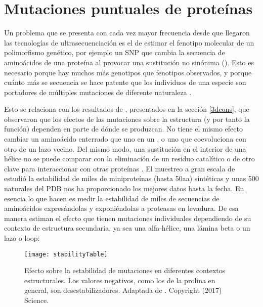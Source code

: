 

\section{Mutaciones puntuales de prote\'{i}nas} \label{pointmut}

Un problema que se presenta con cada vez mayor frecuencia desde que llegaron las tecnolog\'{i}as de 
ultrasecuenciaci\'{o}n es el de estimar el fenotipo molecular de un polimorfismo gen\'{e}tico, 
por ejemplo un SNP que cambia la secuencia de amino\'{a}cidos de una prote\'{i}na al provocar 
una sustituci\'{o}n no sin\'{o}nima (). 
Esto es necesario porque hay muchos m\'{a}s genotipos que fenotipos observados, y porque cu\'{a}nto m\'{a}s se secuencia se hace
patente que los individuos de una especie son portadores de m\'{u}ltiples mutaciones de diferente naturaleza
\citep{Peterson2013}.

Esto se relaciona con los resultados de \citet{Chothia1986}, presentados en la secci\'{o}n \ref{3dcons}, que 
observaron que los efectos de las mutaciones sobre la estructura (y por tanto la funci\'{o}n) dependen en
parte de d\'{o}nde se produzcan. No tiene el mismo efecto cambiar un amino\'{a}cido enterrado que uno en un
, o uno que coevoluciona con otro de un lazo vecino. Del mismo modo, una sustituci\'{o}n en el interior
de una h\'{e}lice no se puede comparar con la eliminaci\'{o}n de un residuo catal\'{i}tico \citep{Berrondo2011}
o de otro clave para interaccionar con otras prote\'{i}nas \citep{deJuan2013}. 
El muestreo a gran escala de \citet{Rocklin2017} estudi\'{o} la estabilidad de miles de miniprote\'{i}nas (hasta 50aa) sint\'{e}ticas 
y unas 500 naturales del PDB nos ha proporcionado los mejores datos hasta la fecha. En esencia lo que hacen es medir la estabilidad 
de miles de secuencias de amino\'{a}cidos expres\'{a}ndolas y exponi\'{e}ndolas a proteasas en levadura.
De esa manera estiman el efecto que tienen mutaciones individuales dependiendo de su contexto de estructura secundaria, 
ya sea una alfa-h\'{e}lice, una l\'{a}mina beta o un lazo o loop:

\begin{figure}
\begin{center} 
\texttt{[image: stabilityTable]}
\caption%
{
Efecto sobre la estabilidad de mutaciones en diferentes contextos estructurales. 
Los valores negativos, como los de la prolina en general, son desestabilizadores. 
Adaptada de \citet{Rocklin2017}. Copyright (2017) Science.
}
\label{fig:miniprotstab} %
\end{center}
\end{figure}

